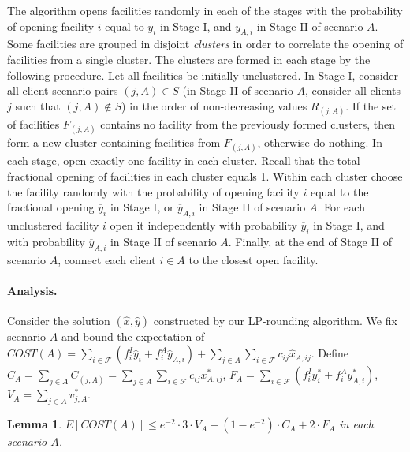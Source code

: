 \documentclass[11pt]{article}
\newtheorem{lemma}[theorem]{Lemma}
\newcommand{\F}{\mathcal{F}}
\begin{document}
The algorithm opens facilities randomly in each of the stages
with the probability of opening facility $i$ equal to $\overline{y}_i$
in Stage I, and $\overline{y}_{A,i}$ in Stage II of scenario $A$.
Some facilities are grouped in disjoint \emph{clusters} in order to correlate 
the opening of facilities from a single cluster.
The clusters are formed in each stage by the following procedure.
Let all facilities be initially unclustered.
In Stage I, consider all client-scenario pairs $(j,A) \in S$
(in Stage II of scenario $A$, consider all clients $j$ such that $(j,A) \notin S$)
in the order of non-decreasing values $R_{(j,A)}$.
If the set of facilities $F_{(j,A)}$ contains no facility
from the previously formed clusters, 
then form a new cluster containing facilities from $F_{(j,A)}$,
otherwise do nothing.
In each stage, open exactly one facility in each cluster.
Recall that the total fractional opening of facilities in each cluster
equals 1. Within each cluster choose the facility randomly with the probability
of opening facility $i$ equal to the fractional opening $\overline{y}_i$ 
in Stage I, or $\overline{y}_{A,i}$ in Stage II of scenario $A$.
For each unclustered facility $i$ open it independently with 
probability $\overline{y}_i$ in Stage I, and with probability $\overline{y}_{A,i}$ in Stage II of scenario $A$.
Finally, at the end of Stage II of scenario $A$, connect each client $i \in A$ to the 
closest open facility.



\paragraph{Analysis.}
Consider the solution $(\hat{x},\hat{y})$ constructed by our LP-rounding algorithm.
We fix scenario $A$ and bound the expectation of 
$COST(A) = \sum_{i \in \F} (f_i^I \hat{y}_{i} + f_i^A \hat{y}_{A,i}) + \sum_{j\in A}\sum_{i\in \F} c_{ij}\hat{x}_{A,ij}$.
Define $C_A = \sum_{j \in A} C_{(j,A)} = \sum_{j \in A} \sum_{i \in \mathcal{F}}c_{ij}x^*_{A,ij}$,
$F_A = \sum_{i \in \F} (f_i^I y^*_{i} + f_i^A y^*_{A,i})$, $V_A = \sum_{j \in A} v^*_{j,A}$.

\begin{lemma} \label{primal_dual_lemma}
  $E[COST(A)] \leq e^{-2} \cdot 3 \cdot V_A + (1-e^{-2}) \cdot C_A + 2 \cdot F_A$ in each scenario $A$.
\end{lemma}
\end{document}
